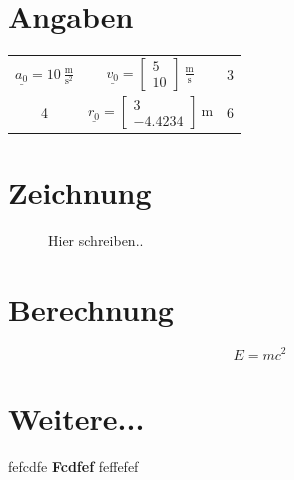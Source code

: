 \documentclass[12pt]{article}
\date{}
\newcommand\m{\:\textrm{m}}
\newcommand\un{\underline}
\newcommand\ms{\:\frac{\textrm{m}}{\textrm{s}}}
\newcommand\mss{\:\frac{\textrm{m}}{\textrm{s}^2}}
\begin{document}
\section*{Angaben}

\begin{table}[h]
    \centering
    \begin{tabular}{c c c}
       $\un{a_0} = 10 \mss$  &  $\un{v_0} = \begin{bmatrix} 5 \\ 10 \end{bmatrix} \ms$  & 3 \\
       4  &  $\un{r_0} = \begin{bmatrix} 3 \\ -4.4234 \end{bmatrix} \m$  & 6 \\
    \end{tabular}
\end{table}

\section{Zeichnung}

\begin{figure}[H]
\centering
  
  \caption{Hier schreiben.. }
  \label{fig:abb}
\end{figure}

\section{Berechnung}

\begin{equation}
    E = mc^2
\end{equation}

\section{Weitere...}
fefcdfe \textbf{Fcdfef} feffefef
\end{document}
